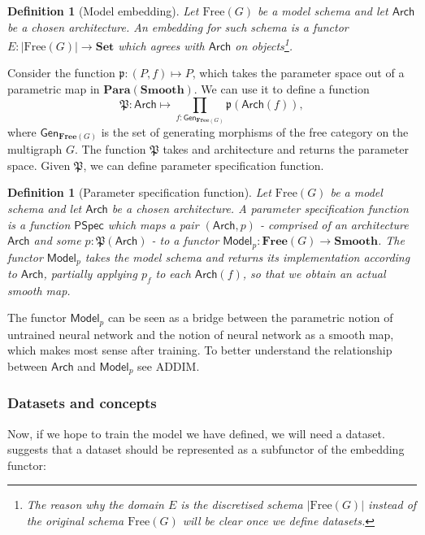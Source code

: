 \documentclass[11pt,a4paper,openright,twoside]{report}
\theoremstyle{plain}
\newtheorem{definition}[proposition]{Definition}
\theoremstyle{definition}
\begin{document}
\begin{definition}[Model embedding]
  Let $\mathrm{Free}(G)$ be a model schema and let $\mathsf{Arch}$ be a chosen architecture. An embedding for such schema is a functor $E: |\mathrm{Free}(G)| \to \mathbf{Set}$ which agrees with $\mathsf{Arch}$ on objects\footnote{The reason why the domain $E$ is the discretised schema $|\mathrm{Free}(G)|$ instead of the original schema $\mathrm{Free}(G)$ will be clear once we define datasets.}.
\end{definition}

Consider the function $\mathfrak{p}: (P,f) \mapsto P$, which takes the parameter space out of a parametric map in $\mathbf{Para}(\mathbf{Smooth})$. We can use it to define a function 
\[\mathfrak{P}: \mathsf{Arch} \mapsto \prod_{f : \mathsf{Gen}_{\mathbf{Free}(G)}}\mathfrak{p}(\mathsf{Arch}(f)),\]
where $\mathsf{Gen}_{\mathbf{Free}(G)}$ is the set of generating morphisms of the free category on the multigraph $G$. The function $\mathfrak{P}$ takes and architecture and returns the parameter space. Given $\mathfrak{P}$, we can define parameter specification function.

\begin{definition}[Parameter specification function]
  Let $\mathrm{Free}(G)$ be a model schema and let $\mathsf{Arch}$ be a chosen architecture. A parameter specification function is a function $\mathsf{PSpec}$ which maps a pair $(\mathsf{Arch}, p)$ - comprised of an architecture $\mathsf{Arch}$ and some $p : \mathfrak{P}(\mathsf{Arch})$ - to a functor $\mathsf{Model}_p: \mathbf{Free}(G) \to \mathbf{Smooth}$. The functor $\mathsf{Model}_p$ takes the model schema and returns its implementation according to $\mathsf{Arch}$, partially applying $p_f$ to each $\mathsf{Arch}(f)$, so that we obtain an actual smooth map. 
\end{definition}

The functor $\mathsf{Model}_p$ can be seen as a bridge between the parametric notion of untrained neural network and the notion of neural network as a smooth map, which makes most sense after training. To better understand the relationship between $\mathsf{Arch}$ and $\mathsf{Model}_p$ see ADDIM.

\subsubsection{Datasets and concepts}

Now, if we hope to train the model we have defined, we will need a dataset. \cite{gavranovic2019compositional} suggests that a dataset should be represented as a subfunctor of the embedding functor:
\end{document}
